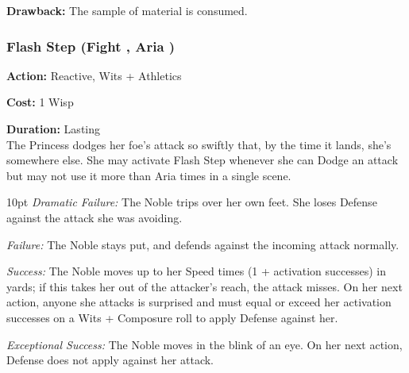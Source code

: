 \textbf{Drawback:} The sample of material is consumed.







\subsubsection*{Flash Step (Fight \textbullet\textbullet\textbullet, Aria \textbullet\textbullet\textbullet)}

\noindent \textbf{Action:} Reactive, Wits + Athletics

\noindent \textbf{Cost:} 1 Wisp

\noindent \textbf{Duration:} Lasting\\

\noindent The Princess dodges her foe's attack so swiftly that, by the time it lands, she's somewhere else. She may activate Flash Step whenever she can Dodge an attack but may not use it more than Aria times in a single scene. 

\begin{myindentpar}{10pt} 
\emph{Dramatic Failure:}  The Noble trips over her own feet. She loses Defense against the attack she was avoiding.

\emph{Failure:} The Noble stays put, and defends against the incoming attack normally.

\emph{Success:}  The Noble moves up to her Speed times (1 + activation successes) in yards; if this takes her out of the attacker’s reach, the attack misses. On her next action, anyone she attacks is surprised and must equal or exceed her activation successes on a Wits + Composure roll to apply Defense against her.

\emph{Exceptional Success:} The Noble moves in the blink of an eye. On her next action, Defense does not apply against her attack.\end{myindentpar}


